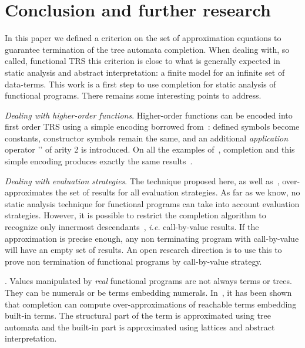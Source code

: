 \documentclass[a4paper,11pt]{llncs}
\def\arobase{\symbol{64}}
\theoremstyle{plain}
\begin{document}
\section{Conclusion and further research}
\label{sec:further}

In this paper we defined a criterion on the set of approximation equations to
guarantee termination of the tree automata completion. When dealing with, so called,
functional TRS this criterion is close to what is generally expected in static
analysis and abstract interpretation: a finite model for an infinite
set of data-terms. This work is a first step to use
completion for static analysis of functional programs. There remains some
interesting points to address.

\medskip
\noindent
{\em Dealing with higher-order functions}. Higher-order
functions can be encoded into first order TRS using a simple encoding 
borrowed from~\cite{Jones-Book87}: defined symbols become constants, constructor
symbols remain the same, and an additional {\em application} operator '\arobase'
of arity 2 is introduced. On all the examples
of~\cite{OngR-POPL11}, 
completion and this simple encoding produces exactly the same
results~\cite{GenetS-rep13}. 

\medskip
\noindent
{\em Dealing with evaluation strategies}. The technique proposed here, as well
as~\cite{OngR-POPL11}, over-approximates the set of results for all evaluation
strategies. As far as we know, no static analysis technique for functional
programs can take into account evaluation strategies. 
However, it is possible to restrict the completion algorithm to
recognize only innermost descendants~\cite{GenetS-rep13}, {\em i.e.}
call-by-value results. If the approximation is precise enough, any non
terminating program with call-by-value will have an empty set of
results. An open research direction is to use this to prove non termination
of functional programs by call-by-value strategy.

\medskip
{}. Values manipulated by {\em real} functional
programs are not always terms or trees. They can be numerals or be terms
embedding numerals. In~\cite{GenetGLM-CIAA13}, it has been shown that completion
can compute over-approximations of reachable terms embedding built-in
terms. The structural part of the term is approximated using tree automata
and the built-in part is approximated using lattices and abstract
interpretation.
\end{document}
